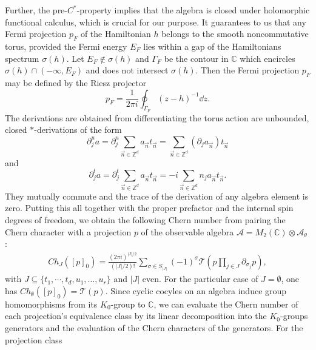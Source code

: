 \documentclass[submission, Phys]{SciPost}
\begin{document}
Further, the pre-$C^\ast$-property implies that the algebra is closed under holomorphic functional calculus, which is crucial for our purpose. 
It guarantees to us that any Fermi projection $p_F$ of the Hamiltonian $h$ belongs to the smooth noncommutative torus, provided the Fermi energy $E_F$ lies within a gap of the Hamiltonians spectrum $\sigma(h)$. 
Let $E_F\notin \sigma(h)$ and $\Gamma_F$ be the contour in $\mathbb{C}$ which encircles $\sigma(h)\cap (-\infty,E_F)$ and does not intersect $\sigma(h)$. 
Then the Fermi projection $p_F$ may be defined by the Riesz projector
\begin{equation}
    p_F = \frac{1}{2\pi i} \oint_{\Gamma_F} (z-h)^{-1} \dd{z}.
    \label{eq:Riesz_projector}
\end{equation}
The derivations are obtained from differentiating the torus action are unbounded, closed $\ast$-derivations of the form %
\begin{equation}
    \partial_j^u a =\partial_j^u \sum_{\vec{n}\in \mathbb{Z}^d} a_{\vec{n}} t_{\vec{n}} = \sum_{\vec{n}\in \mathbb{Z}^d}  (\partial_j a_{\vec{n}}) t_{\vec{n}}
\end{equation}
and
\begin{equation}
    \partial_j^t a =\partial_j^t \sum_{\vec{n}\in \mathbb{Z}^d} a_{\vec{n}} t_{\vec{n}} = -i \sum_{\vec{n}\in \mathbb{Z}^d} n_j a_{\vec{n}} t_{\vec{n}}.
\end{equation}
They mutually commute and the trace of the derivation of any algebra element is zero.
Putting this all together with the proper prefactor and the internal spin degrees of freedom, we obtain the following Chern number from pairing the Chern character with a projection $p$ of the observable algebra $\mathcal{A}=M_2(\mathbb{C})\otimes \mathcal{A}_\theta$ \cite{Prodan2013b}:
\begin{align}
    Ch_J([p]_0) = \frac{(2\pi i )^{ | J| /2 }}{(| J| /2)!}  \sum_{\sigma \in S_{|J|} } (-1)^\sigma \mathcal{T}\left( p \prod_{j \in J} \partial_{\sigma_j} p \right),
    \label{eq:Chernnumber}
\end{align}
with $J\subseteq \{t_1, \cdots, t_d, u_1, \ldots, u_r\}$ and $|J|$ even. For the particular case of $J=\emptyset$, one has $ Ch_\emptyset([p]_0) = \mathcal{T}(p)$.
Since cyclic cocyles on an algebra induce group homomorphisms from its $K_0$-group to $\mathbb{C}$, we can evaluate the Chern number of each projection's equivalence class by its linear decomposition into the $K_0$-groups generators and the evaluation of the Chern characters of the generators. For the projection class
\end{document}

